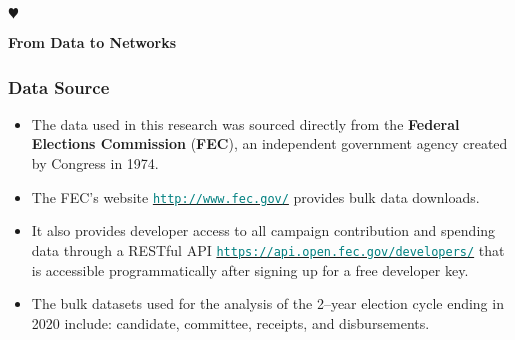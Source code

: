 \documentclass{beamer}
\begin{document}
\begin{frame}
\begin{description}
\item[$\varheart$] {\hyperlink{L4}{\beamergotobutton{\color{yellow}{Conclusions}}}} %


\end{description}

\end{frame}



\begin{frame}[plain,c,label=L1]

\begin{center}
\Huge {\bf{\color{olive}From Data to Networks}}
\end{center}

\end{frame}



\begin{frame}
\frametitle{Data Source}
\begin{itemize}
\item The data used in this research was sourced directly from the {\bf{Federal Elections Commission}} ({\bf{FEC}}),  an independent government agency created by Congress in 1974. 
\item The FEC’s website 
{\href{http://www.fec.gov/}{\texttt{\textcolor{teal}{http://www.fec.gov/}}}}
  provides bulk data downloads. 
\item It also provides developer access to all campaign contribution and spending data through a RESTful API {\href{https://api.open.fec.gov/developers/}{\texttt{\textcolor{teal}{https://api.open.fec.gov/developers/}}}} that is accessible programmatically after signing up for a free developer key.  
\item The bulk datasets used for the analysis of the 2--year election cycle ending in 2020 include: candidate,  committee,  receipts,  and disbursements.
\end{itemize}
\end{frame}
\end{document}
